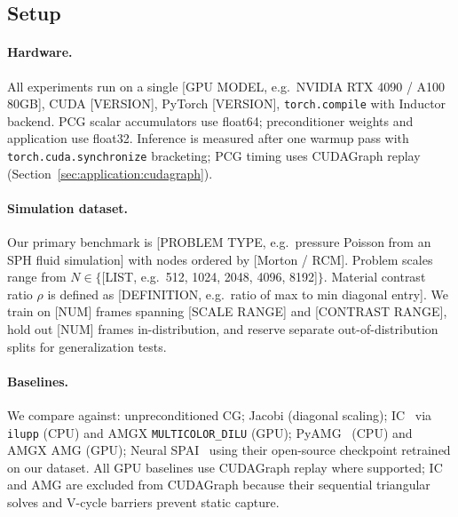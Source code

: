 \documentclass[acmtog,anonymous,review]{acmart}
\begin{document}
\subsection{Setup}
\label{sec:results:setup}

\paragraph{Hardware.}
All experiments run on a single [GPU MODEL, e.g.\ NVIDIA RTX 4090 / A100 80GB], CUDA [VERSION],
PyTorch [VERSION], \texttt{torch.compile} with Inductor backend.  PCG scalar accumulators use
float64; preconditioner weights and application use float32.  Inference is measured after one
warmup pass with \texttt{torch.cuda.synchronize} bracketing; PCG timing uses CUDAGraph replay
(Section~\ref{sec:application:cudagraph}).

\paragraph{Simulation dataset.}
Our primary benchmark is [PROBLEM TYPE, e.g.\ pressure Poisson from an SPH fluid simulation]
with nodes ordered by [Morton / RCM].  Problem scales range from
$N \in \{$[LIST, e.g.\ 512, 1024, 2048, 4096, 8192]$\}$.  Material contrast ratio $\rho$ is
defined as [DEFINITION, e.g.\ ratio of max to min diagonal entry].
We train on [NUM] frames spanning [SCALE RANGE] and [CONTRAST RANGE], hold out [NUM] frames
in-distribution, and reserve separate out-of-distribution splits for generalization tests.

\paragraph{Baselines.}
We compare against: unpreconditioned CG; Jacobi (diagonal scaling);
IC~\cite{lin1999incomplete} via \texttt{ilupp} (CPU) and AMGX \texttt{MULTICOLOR\_DILU} (GPU);
PyAMG~\cite{naumov2015amgx} (CPU) and AMGX AMG (GPU);
Neural SPAI~\cite{yang2025sparse} using their open-source checkpoint retrained on our dataset.
All GPU baselines use CUDAGraph replay where supported; IC and AMG are excluded from CUDAGraph
because their sequential triangular solves and V-cycle barriers prevent static capture.
\end{document}
